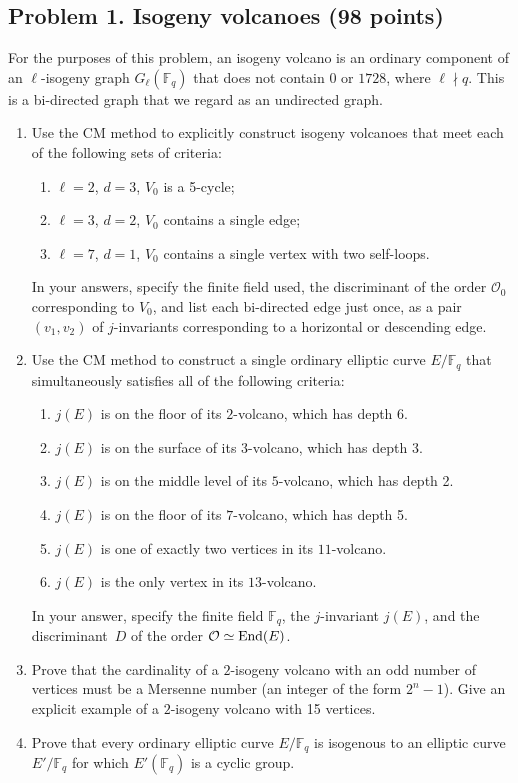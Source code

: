 \documentclass[11pt]{article}
\newcommand{\Fq}{\mathbb{F}_q}
\newcommand{\End}{{\rm End}}
\renewcommand{\O}{\mathcal{O}}
\theoremstyle{definition}
\begin{document}
\subsection*{Problem 1. Isogeny volcanoes (98 points)}

For the purposes of this problem, an isogeny volcano is an ordinary component of an $\ell$-isogeny graph $G_\ell(\Fq)$ that does not contain $0$ or $1728$, where $\ell\nmid q$.
This is a bi-directed graph that we regard as an undirected graph.

\begin{enumerate}[{\bf (a)}]
\item Use the CM method to explicitly construct isogeny volcanoes that meet each of the following sets of criteria:
\begin{enumerate}[{\bf(i)}]
\item $\ell=2$, $d=3$, $V_0$ is a 5-cycle;
\item $\ell=3$, $d=2$, $V_0$ contains a single edge;
\item $\ell=7$, $d=1$, $V_0$ contains a single vertex with two self-loops.
\end{enumerate}
In your answers, specify the finite field used, the discriminant of the order $\O_0$ corresponding to $V_0$, and list each bi-directed edge just once, as a pair $(v_1,v_2)$ of $j$-invariants corresponding to a horizontal or descending edge.
\item Use the CM method to construct a single ordinary elliptic curve $E/\Fq$ that simultaneously satisfies all of the following criteria:
\begin{enumerate}[{\bf (i)}]
\item $j(E)$ is on the floor of its $2$-volcano, which has depth 6.
\item $j(E)$ is on the surface of its $3$-volcano, which has depth 3.
\item $j(E)$ is on the middle level of its $5$-volcano, which has depth 2.
\item $j(E)$ is on the floor of its $7$-volcano, which has depth 5.
\item $j(E)$ is one of exactly two vertices in its $11$-volcano.
\item $j(E)$ is the only vertex in its $13$-volcano.
\end{enumerate}
In your answer, specify the finite field $\Fq$, the $j$-invariant $j(E)$, and the discriminant~$D$ of the order $\O\simeq\End(E)$.

\item
Prove that the cardinality of a $2$-isogeny volcano with an odd number of vertices must be a Mersenne number (an integer of the form $2^n-1$).  Give an explicit example of a $2$-isogeny volcano with 15 vertices.
\item
Prove that every ordinary elliptic curve $E/\Fq$ is isogenous to an elliptic curve $E'/\Fq$ for which $E'(\Fq)$ is a cyclic group.
\end{enumerate}
\end{document}
